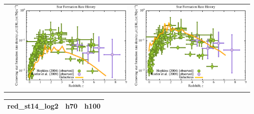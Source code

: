 \begin{itemize}
\begin{table}[p]
\begin{tabular}{l|c|c}
 & \includegraphics[scale=0.5]{r256/h70/red_st14_log1/Plot_Star_Formation_History.pdf} & \includegraphics[scale=0.5]{r256/h100/red_st14_log1/Plot_Star_Formation_History.pdf} \\
\end{tabular}
\end{table}
\begin{table}[p]
\centering
\begin{tabular}{l|c|c}
 red\_st14\_log2 & h70 & h100 \\
\hline 

\end{tabular}
\end{table}
\end{itemize}
